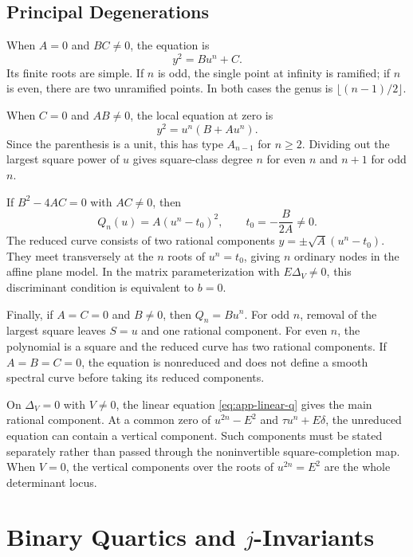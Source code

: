 \documentclass[11pt,reqno]{amsart}
\theoremstyle{remark}
\begin{document}
\subsection{Principal Degenerations}

When $A=0$ and $BC\ne0$, the equation is
\begin{equation}\label{eq:app-A-zero}
 y^2=Bu^n+C.
\end{equation}
Its finite roots are simple.  If $n$ is odd, the single point at infinity is
ramified; if $n$ is even, there are two unramified points.  In both cases the
genus is $\lfloor(n-1)/2\rfloor$.

When $C=0$ and $AB\ne0$, the local equation at zero is
\begin{equation}\label{eq:app-C-zero-local}
 y^2=u^n(B+Au^n).
\end{equation}
Since the parenthesis is a unit, this has type $A_{n-1}$ for $n\geq2$.
Dividing out the largest square power of $u$ gives square-class degree $n$
for even $n$ and $n+1$ for odd $n$.

If $B^2-4AC=0$ with $AC\ne0$, then
\begin{equation}\label{eq:app-perfect-square}
 Q_n(u)=A(u^n-t_0)^2,
 \qquad t_0=-\frac{B}{2A}\ne0.
\end{equation}
The reduced curve consists of two rational components
$y=\pm\sqrt A(u^n-t_0)$.  They meet transversely at the $n$ roots of
$u^n=t_0$, giving $n$ ordinary nodes in the affine plane model.  In the
matrix parameterization with $E\Delta_V\ne0$, this discriminant condition is
equivalent to $b=0$.

Finally, if $A=C=0$ and $B\ne0$, then $Q_n=Bu^n$.  For odd $n$, removal of the
largest square leaves $S=u$ and one rational component.  For even $n$, the
polynomial is a square and the reduced curve has two rational components.
If $A=B=C=0$, the equation is nonreduced and does not define a smooth spectral
curve before taking its reduced components.

On $\Delta_V=0$ with $V\ne0$, the linear equation
\eqref{eq:app-linear-q} gives the main rational component.  At a common zero of
$u^{2n}-E^2$ and $\tau u^n+E\delta$, the unreduced equation can contain a
vertical component.  Such components must be stated separately rather than
passed through the noninvertible square-completion map.  When $V=0$, the
vertical components over the roots of $u^{2n}=E^2$ are the whole determinant
locus.

\section{Binary Quartics and \texorpdfstring{$j$}{j}-Invariants}
\label{app:binary-quartics}
\end{document}
